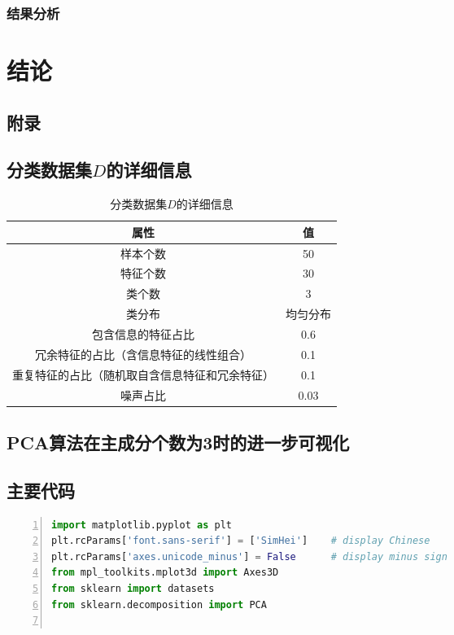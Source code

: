 \documentclass[12pt,a4paper]{article}
\theoremstyle{definition}
\begin{document}
\subsubsection{结果分析}

\section{结论}

\newpage
\begin{appendix}
	\section{附录}
	\subsection{分类数据集$D$的详细信息}
	\label{apd:dataset_para}
	\begin{table}[H]
		\renewcommand\arraystretch{1.35}
		\caption{分类数据集$D$的详细信息}
		\label{tab:dataset_para}
		\centering
		
		\begin{tabular}{c|c}
			\centering
			属性 & 值 \\
			\hline
			样本个数 & 50 \\
			特征个数 & 30 \\
			类个数 & 3 \\
			类分布 & 均匀分布 \\
			包含信息的特征占比 & 0.6 \\
			冗余特征的占比（含信息特征的线性组合） & 0.1 \\
			重复特征的占比（随机取自含信息特征和冗余特征） & 0.1 \\
			噪声占比 & 0.03 \\		
		\end{tabular}
	\end{table}
	
	\subsection{PCA算法在主成分个数为3时的进一步可视化}
	\label{apd:vis3}
	
	\subsection{主要代码}
	\label{apd:code}
	
	\begin{lstlisting}[language=Python,
	numbers=left,
	keywordstyle=\color{blue!70},
	frame=shadowbox,
	breaklines=True]
import matplotlib.pyplot as plt
plt.rcParams['font.sans-serif'] = ['SimHei']    # display Chinese
plt.rcParams['axes.unicode_minus'] = False      # display minus sign
from mpl_toolkits.mplot3d import Axes3D
from sklearn import datasets
from sklearn.decomposition import PCA


\end{lstlisting}
\end{appendix}
\end{document}
